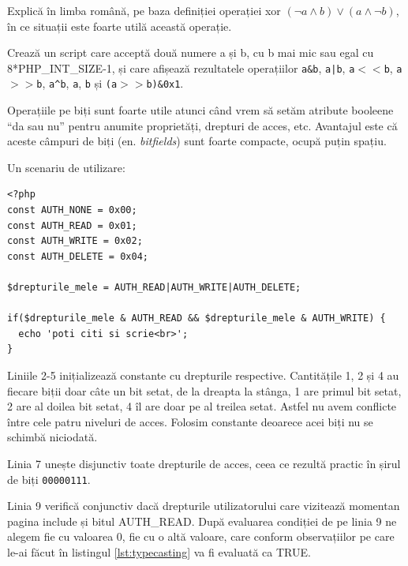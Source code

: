 \begin{Exercise}[title={Jonglează cu expresii boolene},difficulty=3]
Explică în limba română, pe baza definiției operației xor
$(\lnot a \land b) \lor (a \land \lnot b)$,
în ce situații este foarte utilă această operație.
\end{Exercise}


\begin{Exercise}[title={Operații pe biți}]
Crează un script care acceptă două numere a și b, cu b mai mic sau egal cu 8*PHP\_INT\_SIZE-1, și
care afișează rezultatele operațiilor \texttt{a\&b}, \texttt{a|b}, \texttt{a$<<$b},
\texttt{a$>>$b}, \texttt{a{\textasciicircum}b},
\texttt{{\texttildelow}a}, \texttt{{\texttildelow}b} și \texttt{(a$>>$b)\&0x1}.
\end{Exercise}

Operațiile pe biți sunt foarte utile atunci când vrem să setăm atribute booleene ``da sau nu''
pentru anumite proprietăți, drepturi de acces, etc. Avantajul este că aceste câmpuri de biți
(en. \textsl{bitfields}) sunt foarte compacte, ocupă puțin spațiu.

Un scenariu de utilizare:
\begin{lstlisting}
<?php
const AUTH_NONE = 0x00;
const AUTH_READ = 0x01;
const AUTH_WRITE = 0x02;
const AUTH_DELETE = 0x04;

$drepturile_mele = AUTH_READ|AUTH_WRITE|AUTH_DELETE;

if($drepturile_mele & AUTH_READ && $drepturile_mele & AUTH_WRITE) {
  echo 'poti citi si scrie<br>';
}
\end{lstlisting}
Liniile 2-5 inițializează constante cu drepturile respective.  Cantitățile 1, 2 și 4
au fiecare biții doar câte un bit setat, de la dreapta la stânga, 1 are primul bit setat,
2 are al doilea bit setat, 4 îl are doar pe al treilea setat. Astfel nu avem conflicte
între cele patru niveluri de acces. Folosim constante
deoarece acei biți nu se schimbă niciodată.

Linia 7 unește disjunctiv toate drepturile de acces, ceea ce rezultă practic în șirul
de biți \texttt{00000111}.

Linia 9 verifică conjunctiv dacă drepturile utilizatorului care vizitează
momentan pagina include și bitul AUTH\_READ. După evaluarea condiției
de pe linia 9 ne alegem fie cu valoarea 0, fie cu o altă valoare,
care conform observațiilor pe care le-ai făcut în listingul \ref{lst:typecasting}
va fi evaluată ca TRUE.

